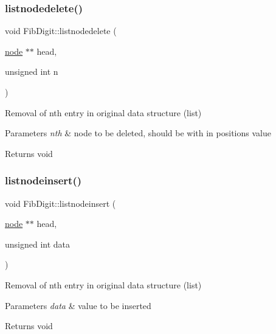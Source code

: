 \subsubsection{\texorpdfstring{listnodedelete()}{listnodedelete()}}
{\footnotesize\ttfamily void Fib\+Digit\+::listnodedelete (\begin{DoxyParamCaption}\item[{\mbox{\hyperlink{structnode}{node}} $\ast$$\ast$}]{head,  }\item[{unsigned int}]{n }\end{DoxyParamCaption})\hspace{0.3cm}{\ttfamily [virtual]}}



Removal of nth entry in original data structure (list) 


\begin{DoxyParams}{Parameters}
{\em nth} & node to be deleted, should be with in positions value \\
\hline
\end{DoxyParams}
\begin{DoxyReturn}{Returns}
void 
\end{DoxyReturn}
\mbox{\label{classFibDigit_a6cfa565c583a0209b857445bcb788624}} 
\subsubsection{\texorpdfstring{listnodeinsert()}{listnodeinsert()}}
{\footnotesize\ttfamily void Fib\+Digit\+::listnodeinsert (\begin{DoxyParamCaption}\item[{\mbox{\hyperlink{structnode}{node}} $\ast$$\ast$}]{head,  }\item[{unsigned int}]{data }\end{DoxyParamCaption})\hspace{0.3cm}{\ttfamily [virtual]}}



Removal of nth entry in original data structure (list) 


\begin{DoxyParams}{Parameters}
{\em data} & value to be inserted \\
\hline
\end{DoxyParams}
\begin{DoxyReturn}{Returns}
void 
\end{DoxyReturn}
\mbox{\label{classFibDigit_af3285f686c8e8968dc604388b9ee65be}} 
